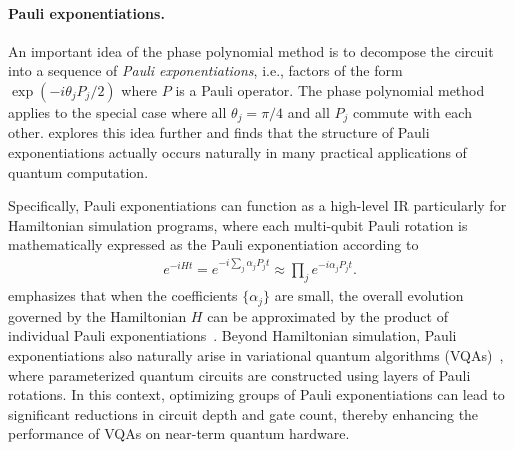 \documentclass[a4paper,onecolumn,11pt,unpublished]{quantumarticle}
\begin{document}
\paragraph{Pauli exponentiations.} 

An important idea of the phase polynomial method is to decompose the circuit into a sequence of \textit{Pauli exponentiations}, i.e., factors of the form $\exp(-i\theta_j P_j/2)$ where $P$ is a Pauli operator. The phase polynomial method applies to the special case where all $\theta_j = \pi/4$ and all $P_j$ commute with each other. \cite{yang2025phoenix} explores this idea further and finds that the structure of Pauli exponentiations actually occurs naturally in many practical applications of quantum computation.

Specifically, Pauli exponentiations can function as a high-level IR particularly for Hamiltonian simulation programs, where each multi-qubit Pauli rotation is mathematically expressed as the Pauli exponentiation according to
\begin{align}
  e^{-iHt} = e^{-i \sum_j \alpha_j P_j t} \approx \prod\nolimits_j e^{-i \alpha_j P_j t}.
  \label{eq:pauli_exp}
\end{align}
 emphasizes that when the coefficients $\{\alpha_j\}$ are small, the overall evolution governed by the Hamiltonian $ H $ can be approximated by the product of individual Pauli exponentiations~\cite{dalzell_quantum_2023}.
Beyond Hamiltonian simulation, Pauli exponentiations also naturally arise in variational quantum algorithms (VQAs)~\cite{Cerezo2021}, where parameterized quantum circuits are constructed using layers of Pauli rotations. In this context, optimizing groups of Pauli exponentiations can lead to significant reductions in circuit depth and gate count, thereby enhancing the performance of VQAs on near-term quantum hardware.
\end{document}
